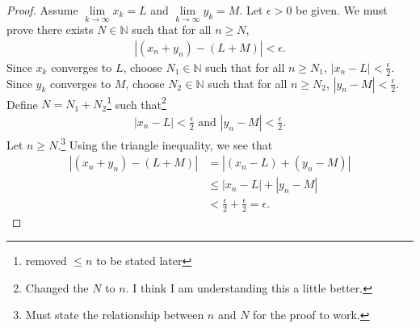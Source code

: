 \documentclass[12pt]{amsart}
\newcommand{\N}{\mathbb{N}}
\begin{document}
\begin{proof}
Assume $\lim\limits_{k\rightarrow\infty}x_k = L$ and $\lim\limits_{k\rightarrow\infty}y_k = M$.  Let $\epsilon>0$ be given.  We must prove there exists $N\in\N$ such that for all $n\geq N$,
\begin{align*}
\left\lvert (x_n + y_n) - (L + M)\right\rvert < \epsilon.
\end{align*}
Since $x_k$ converges to $L$, choose $N_1\in\N$ such that for all $n\geq N_1$, $\left\lvert x_n - L \right\rvert < \frac{\epsilon}{2}$.\\
Since $y_k$ converges to $M$, choose $N_2\in\N$ such that for all $n\geq N_2$, $\left\lvert y_n - M \right\rvert < \frac{\epsilon}{2}$.\\
Define $N=N_1+N_2$\footnote{removed $\leq n$ to be stated later} such that\footnote{Changed the $N$ to $n$.  I think I am understanding this a little better.}
\begin{align*}
\left\lvert x_n - L \right\rvert < \frac{\epsilon}{2} \text{ and } \left\lvert y_n - M \right\rvert < \frac{\epsilon}{2}.
\end{align*}
Let $n\geq N$.\footnote{Must state the relationship between $n$ and $N$ for the proof to work.}  Using the triangle inequality, we see that
\begin{align*}
\left\lvert (x_n + y_n) - (L + M)\right\rvert &= \left\lvert (x_n - L) + (y_n - M) \right\rvert\\
&\leq \left\lvert x_n - L \right\rvert + \left\lvert y_n - M \right\rvert\\
&< \frac{\epsilon}{2} + \frac{\epsilon}{2} = \epsilon.
\end{align*}
\end{proof}
\end{document}
